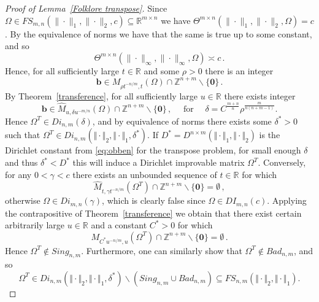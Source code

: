 \documentclass[10pt]{amsart}
\theoremstyle{definition}
\newcommand{\R}{\mathbb{R}}
\newcommand{\Z}{\mathbb{Z}}
\begin{document}
 \begin{proof}[Proof of Lemma~\ref{Folklore transpose}]
     Since $\Omega \in FS_{m,n}(\|\cdot\|_{1},\|\cdot\|_{2},c)\subseteq \R^{m\times n}$ we have
     $\Theta^{m\times n}(\|\cdot\|_{1},\|\cdot\|_{2},\Omega)=c$. By the equivalence of norms we have that the same is true up to some constant, and so
      \begin{equation*}
         \Theta^{m\times n}(\|\cdot\|_{\infty},\|\cdot\|_{\infty},\Omega)\asymp c\, .
     \end{equation*}
     Hence, for all sufficiently large $t\in\R$ and some $\rho>0$ there is an integer
     \begin{equation*}
         \boldsymbol{b} \in M_{\rho t^{-n/m},t}(\Omega)\cap\Z^{n+m}\backslash \{\textbf{0}\}\, .
     \end{equation*}
     By Theorem~\ref{transference}, for all sufficiently large $u\in\R$ there exists integer
     \begin{equation*}
         \boldsymbol{b} \in \widehat{M}_{u,\delta u^{-m/n}}(\Omega)\cap\Z^{n+m}\backslash \{\textbf{0}\}\, , \quad \text{ for } \quad \delta=C^{\tfrac{m+n}{n}}\rho^{\tfrac{m}{n(n+m-1)}}.
     \end{equation*}
     Hence $\Omega^{T} \in Di_{n,m}(\delta)$, and by equivalence of norms there exists some $\delta^{*}>0$ such that $\Omega^{T}\in Di_{n,m}(\Vert\cdot\Vert_{2},\Vert\cdot\Vert_{1},\delta^{*})$. 
     If $D^{*}=D^{n\times m}(\Vert\cdot\Vert_1,\Vert\cdot\Vert_2)$ is the Dirichlet constant from \eqref{eq:obben} for the transpose problem,
     for small enough $\delta$ and thus $\delta^{*}<D^{*}$ this will induce a Dirichlet
     improvable matrix $\Omega^{T}$.
     Conversely, for any $0<\gamma<c$ there exists an unbounded sequence of $t\in\R$ for which 
     \begin{equation*}
         \widehat{M}_{t,\gamma t^{-n/m}}(\Omega^{T})\cap \Z^{n+m}\backslash\{\textbf{0}\} = \emptyset\, ,
     \end{equation*}
     otherwise $\Omega \in Di_{m,n}(\gamma)$, which is clearly false since $\Omega \in DI_{m,n}(c)$. Applying the contrapositive of Theorem~\ref{transference} we obtain that there exist certain arbitrarily large $u\in\R$ and a constant $C^{*}>0$ for which
     \begin{equation*}
         M_{C^{*}u^{-n/m},u}(\Omega^{T})\cap\Z^{n+m}\backslash\{\textbf{0}\} = \emptyset\, .
     \end{equation*}
     Hence $\Omega^{T} \not\in Sing_{n,m}$. Furthermore, one can similarly show that $\Omega^{T} \not \in Bad_{n,m}$, and so $$\Omega^{T} \in Di_{n,m}(\Vert\cdot\Vert_{2},\Vert\cdot\Vert_{1},\delta^{*})\backslash (Sing_{n,m}\cup Bad_{n,m})\subseteq FS_{n,m}(\Vert\cdot\Vert_{2},\Vert\cdot\Vert_{1}).$$ 
 \end{proof}
\end{document}
